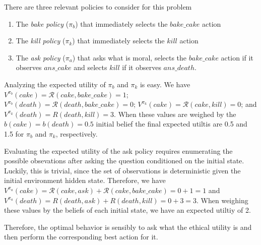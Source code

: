 \documentclass[11pt]{article}
\begin{document}
There are three relevant policies to consider for this problem
\begin{enumerate}
\item The {\em bake policy} ($\pi_b$) that immediately selects the $bake\_cake$ action
\item The {\em kill policy} ($\pi_k$) that immediately selects the $kill$ action
\item The {\em ask policy} ($\pi_a$) that asks what is moral, selects the $bake\_cake$ action if it observes $ans\_cake$ and selects $kill$ if it observes $ans\_death$.
\end{enumerate}

Analyzing the expected utility of $\pi_b$ and $\pi_k$ is easy. We have $V^{\pi_b}(cake) = \mathcal{R}(cake, bake\_cake) = 1$; $V^{\pi_b}(death) = \mathcal{R}(death, bake\_cake) = 0$; $V^{\pi_k}(cake) = \mathcal{R}(cake, kill) = 0$; and $V^{\pi_k}(death) = R(death, kill) = 3$. When these values are weighed by the $b(cake) = b(death) = 0.5$ initial belief the final expected utiltis are 0.5 and 1.5 for $\pi_b$ and $\pi_k$, respectively.

Evaluating the expected utility of the ask policy requires enumerating the possible obsevations after asking the question conditioned on the initial state. Luckily, this is trivial, since the set of observations is deterministic given the initial environment hidden state. Therefore, we have $V^{\pi_a}(cake) = \mathcal{R}(cake, ask) + \mathcal{R}(cake, bake\_cake) = 0 + 1 = 1$ and $V^{\pi_a}(death) = R(death, ask) + R(death, kill) = 0 + 3 = 3$. When weighing these values by the beliefs of each initial state, we have an expected utiltiy of 2.

Therefore, the optimal behavior is sensibly to ask what the ethical utility is and then perform the corresponding best action for it.


\end{document}
